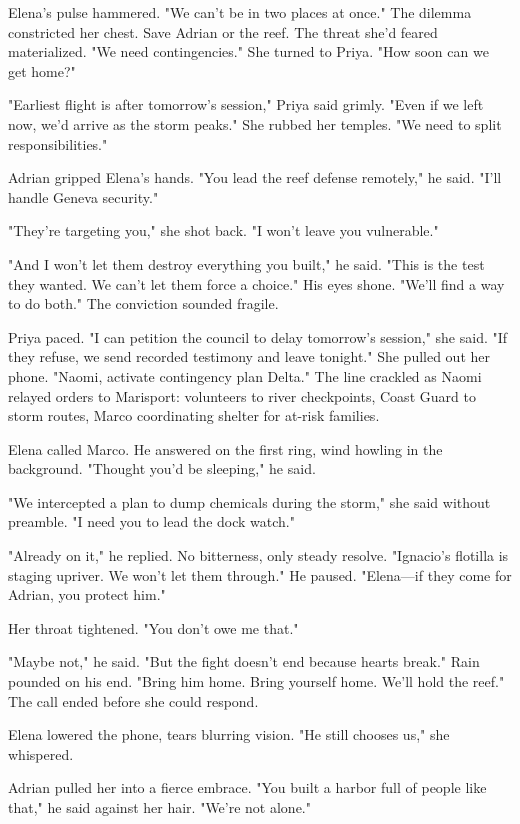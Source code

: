 Elena's pulse hammered. "We can't be in two places at once." The dilemma constricted her chest. Save Adrian or the reef. The threat she'd feared materialized. "We need contingencies." She turned to Priya. "How soon can we get home?"

"Earliest flight is after tomorrow's session," Priya said grimly. "Even if we left now, we'd arrive as the storm peaks." She rubbed her temples. "We need to split responsibilities."

Adrian gripped Elena's hands. "You lead the reef defense remotely," he said. "I'll handle Geneva security."

"They're targeting you," she shot back. "I won't leave you vulnerable."

"And I won't let them destroy everything you built," he said. "This is the test they wanted. We can't let them force a choice." His eyes shone. "We'll find a way to do both." The conviction sounded fragile.

Priya paced. "I can petition the council to delay tomorrow's session," she said. "If they refuse, we send recorded testimony and leave tonight." She pulled out her phone. "Naomi, activate contingency plan Delta." The line crackled as Naomi relayed orders to Marisport: volunteers to river checkpoints, Coast Guard to storm routes, Marco coordinating shelter for at-risk families.

Elena called Marco. He answered on the first ring, wind howling in the background. "Thought you'd be sleeping," he said.

"We intercepted a plan to dump chemicals during the storm," she said without preamble. "I need you to lead the dock watch."

"Already on it," he replied. No bitterness, only steady resolve. "Ignacio's flotilla is staging upriver. We won't let them through." He paused. "Elena—if they come for Adrian, you protect him."

Her throat tightened. "You don't owe me that."

"Maybe not," he said. "But the fight doesn't end because hearts break." Rain pounded on his end. "Bring him home. Bring yourself home. We'll hold the reef." The call ended before she could respond.

Elena lowered the phone, tears blurring vision. "He still chooses us," she whispered.

Adrian pulled her into a fierce embrace. "You built a harbor full of people like that," he said against her hair. "We're not alone."

